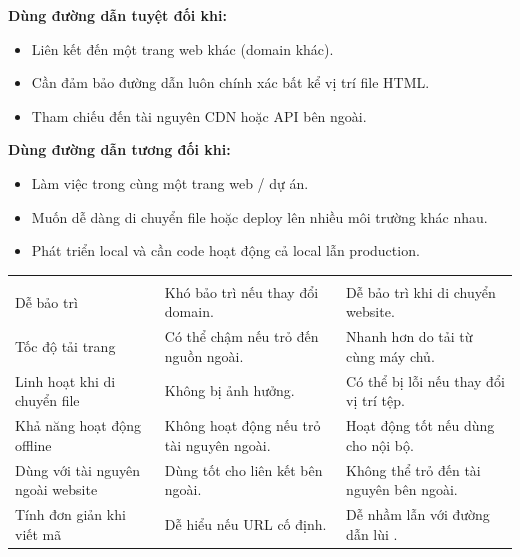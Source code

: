 \begin{conceptBox}
\textbf{Dùng đường dẫn tuyệt đối khi:}
\begin{itemize}[leftmargin=1.5em, itemsep=1pt, parsep=0pt]
    \item Liên kết đến một trang web khác (domain khác).
    \item Cần đảm bảo đường dẫn luôn chính xác bất kể vị trí file HTML.
    \item Tham chiếu đến tài nguyên CDN hoặc API bên ngoài.
\end{itemize}

\textbf{Dùng đường dẫn tương đối khi:}
\begin{itemize}[leftmargin=1.5em, itemsep=1pt, parsep=0pt]
    \item Làm việc trong cùng một trang web / dự án.
    \item Muốn dễ dàng di chuyển file hoặc deploy lên nhiều môi trường khác nhau.
    \item Phát triển local và cần code hoạt động cả local lẫn production.
\end{itemize}
\end{conceptBox}

\begin{prettyTableBox}
\begin{tabularx}{\linewidth}{L{4cm} L{4.5cm} Z}
 &  &  \\
Dễ bảo trì & Khó bảo trì nếu thay đổi domain. & Dễ bảo trì khi di chuyển website. \\
Tốc độ tải trang & Có thể chậm nếu trỏ đến nguồn ngoài. & Nhanh hơn do tải từ cùng máy chủ. \\
Linh hoạt khi di chuyển file & Không bị ảnh hưởng. & Có thể bị lỗi nếu thay đổi vị trí tệp. \\
Khả năng hoạt động offline & Không hoạt động nếu trỏ tài nguyên ngoài. & Hoạt động tốt nếu dùng cho nội bộ. \\
Dùng với tài nguyên ngoài website & Dùng tốt cho liên kết bên ngoài. & Không thể trỏ đến tài nguyên bên ngoài. \\
Tính đơn giản khi viết mã & Dễ hiểu nếu URL cố định. & Dễ nhầm lẫn với đường dẫn lùi . \\
\end{tabularx}
\end{prettyTableBox}

